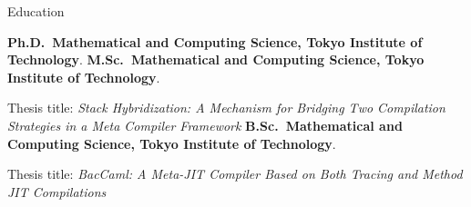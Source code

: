 \begin{rubric}{Education}

\entry*[2020-now]%
\textbf{Ph.D.~Mathematical and Computing Science, Tokyo Institute of Technology}.
%
\entry*[2018-2020]%
\textbf{M.Sc.~Mathematical and Computing Science, Tokyo Institute of Technology}.\par
Thesis title: \textit{Stack Hybridization: A Mechanism for Bridging Two Compilation Strategies in a Meta Compiler Framework}
\entry*[2014-2018]%
\textbf{B.Sc.~Mathematical and Computing Science, Tokyo Institute of Technology}.\par
Thesis title: \textit{BacCaml: A Meta-JIT Compiler Based on Both Tracing and Method JIT Compilations}
\end{rubric}
